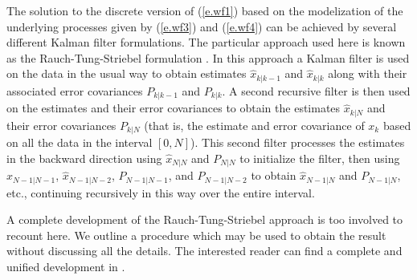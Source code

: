 	The solution to the discrete version of (\ref{e.wf1})
based on the modelization of the underlying processes
given by (\ref{e.wf3}) and (\ref{e.wf4}) can be achieved by
several different Kalman filter formulations.  The particular
approach used here is known as the Rauch-Tung-Striebel
formulation \cite{Gelb}.
In this approach a Kalman filter is
used on the data in the usual way to obtain
estimates $\hat{x}_{k|k-1}$ and $\hat{x}_{k|k}$ along with their associated
error covariances $P_{k|k-1}$ and $P_{k|k}$.  A second recursive
filter is then used on the estimates and their error
covariances to obtain the estimates $\hat{x}_{k|N}$ and their
error covariances $P_{k|N}$ (that is, the estimate and error covariance
of $x_k$ based on all the data in the interval $[0,N]$).  This second
filter processes the estimates in the backward direction using
$\hat{x}_{N|N}$ and $P_{N|N}$ to initialize the filter,
then using $\hat{x}_{N-1|N-1}$, $\hat{x}_{N-1|N-2}$, $P_{N-1|N-1}$, and
$P_{N-1|N-2}$ to obtain $\hat{x}_{N-1|N}$ and $P_{N-1|N}$, etc.,
continuing recursively in this way over the entire interval.

	A complete development of the Rauch-Tung-Striebel
approach is too involved
to recount here.  We outline a procedure which may be used
to obtain the result without discussing all the
details.  The interested reader can find a complete and
unified development in \cite{Nikoukhah}.

